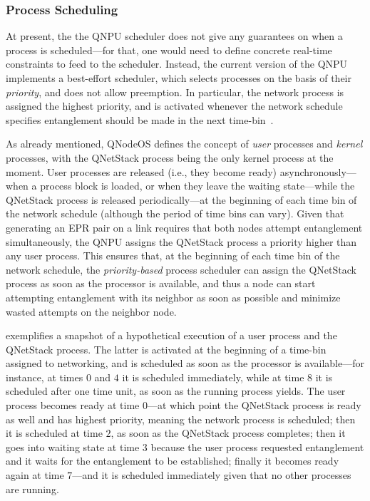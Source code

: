 \subsubsection{Process Scheduling}
\label{qnodeos:sec:design:scheduling}

At present, the the \ac{QNPU} scheduler does not give any guarantees on when a process is scheduled---for that, one would need to define concrete real-time constraints to feed to the scheduler. Instead, the current version of the \ac{QNPU} implements a best-effort scheduler, which selects processes on the basis of their \emph{priority}, and does not allow preemption. In particular, the network process is assigned the highest priority, and is activated whenever the network schedule specifies entanglement should be made in the next time-bin~\cite{skrzypczyk_2021_arch}. 

As already mentioned, \ac{QNodeOS} defines the concept of \emph{user} processes and \emph{kernel} processes, with the \ac{QNetStack} process being the only kernel process at the moment. User processes are released (i.e., they become ready) asynchronously---when a process block is loaded, or when they leave the waiting state---while the \ac{QNetStack} process is released periodically---at the beginning of each time bin of the network schedule (although the period of time bins can vary). Given that generating an \ac{EPR} pair on a link requires that both nodes attempt entanglement simultaneously, the \ac{QNPU} assigns the \ac{QNetStack} process a priority higher than any user process. This ensures that, at the beginning of each time bin of the network schedule, the \emph{priority-based} process scheduler can assign the \ac{QNetStack} process as soon as the processor is available, and thus a node can start attempting entanglement with its neighbor as soon as possible and minimize wasted attempts on the neighbor node.

 exemplifies a snapshot of a hypothetical execution of a user process and the \ac{QNetStack} process. The latter is activated at the beginning of a time-bin assigned to networking, and is scheduled as soon as the processor is available---for instance, at times $0$ and $4$ it is scheduled immediately, while at time $8$ it is scheduled after one time unit, as soon as the running process yields. The user process becomes ready at time $0$---at which point the \ac{QNetStack} process is ready as well and has highest priority, meaning the network process is scheduled; then it is scheduled at time $2$, as soon as the \ac{QNetStack} process completes; then it goes into waiting state at time $3$ because the user process requested entanglement and it waits for the entanglement to be established; finally it becomes ready again at time $7$---and it is scheduled immediately given that no other processes are running.

